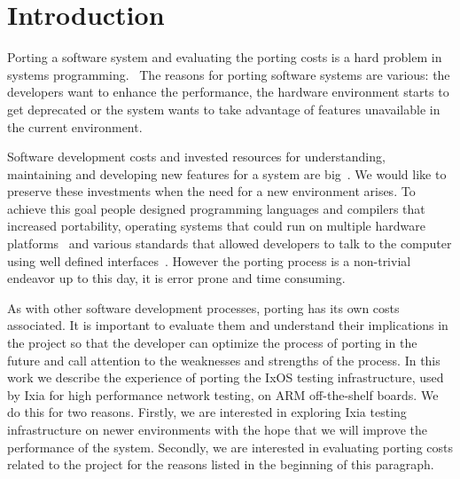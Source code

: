 \chapter{Introduction}\pagestyle{fancy}



Porting a software system and evaluating the porting costs is a hard problem in
systems
programming.~\cite{tanaka,hakuta,mooney2004developing,kanai,porquet2015,
bodenstab1984unix,osdevcrossport,jolitz1990porting,frakes1995sixteen,
tanenbaum1978guidelines,johnson1978unix}
The reasons for porting software systems are various: the developers want to
enhance the performance, the hardware environment starts to get deprecated or
the system wants to take advantage of features unavailable in the current
environment.

Software development costs and invested resources for understanding, maintaining
and developing new features for a system are
big~\cite{xia2017measuring,boehm2000software,morgan1994controlling}. We would
like to preserve these investments when the need for a new environment arises.
To achieve this goal people designed programming languages and compilers that
increased portability, operating systems that could run on multiple hardware
platforms~\cite{johnson1978unix} and various standards that allowed developers to talk to
the computer using well defined interfaces~\cite{walli1995posix}. However the porting
process is a non-trivial endeavor up to this day, it is error prone and time
consuming.

As with other software development processes, porting has its own costs
associated. It is important to evaluate them and understand their implications
in the project so that the developer can optimize the process of porting in the
future and call attention to the weaknesses and strengths of the process. In
this work we describe the experience of porting the IxOS testing infrastructure,
used by Ixia for high performance network testing, on ARM off-the-shelf boards.
We do this for two reasons. Firstly, we are interested in exploring Ixia testing
infrastructure on newer environments with the hope that we will improve the
performance of the system. Secondly, we are interested in evaluating porting
costs related to the project for the reasons listed in the beginning of this
paragraph. 

